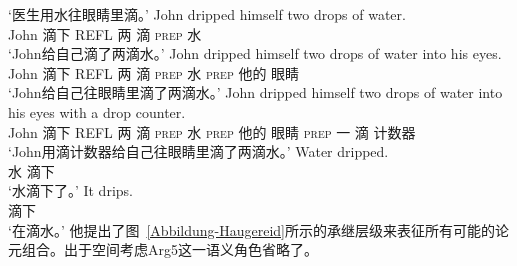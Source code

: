 \begin{exe}
\begin{xlist}[iv.]
\begin{exe}
\begin{xlist}[iv.]
\glt `医生用水往眼睛里滴。' 
\ex
\gll John dripped himself two drops of water.     \\
     John 滴下 REFL 两 滴 \textsc{prep} 水\\
\glt `John给自己滴了两滴水。' 
\ex
\gll John dripped himself two drops of water into his eyes. \\
     John 滴下 REFL 两 滴 \textsc{prep} 水 \textsc{prep} 他的 眼睛\\
\glt `John给自己往眼睛里滴了两滴水。' 
\ex
\gll John dripped himself two drops of water into his eyes with a drop counter. \\
     John 滴下 REFL 两 滴 \textsc{prep} 水 \textsc{prep} 他的 眼睛 \textsc{prep} 一 滴 计数器\\
\glt `John用滴计数器给自己往眼睛里滴了两滴水。' 
\ex
\gll Water dripped. \\
     水 滴下\\
\glt `水滴下了。' 
\ex
\gll It drips. \\
     \expl{} 滴下\\
\glt `在滴水。' 
\zl
他提出了图~\ref{Abbildung-Haugereid}所示的承继层级来表征所有可能的论元组合。出于空间考虑Arg5这一语义角色省略了。


\end{xlist}
\end{exe}
\end{xlist}
\end{exe}
